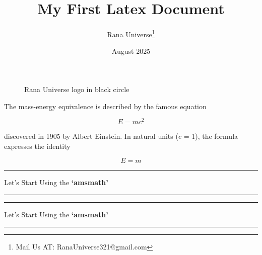 \documentclass[12pt, letterpaper]{article}
\title{My First Latex Document}
\author{Rana Universe\thanks{Mail Us AT: RanaUniverse321@gmail.com}}
\date{August 2025}
\begin{document}
\maketitle






\begin{figure}[htbp]
\centering


\caption{Rana Universe logo in black circle}

\label{fig:rana-universe-logo}

\end{figure}





\newpage


The mass-energy equivalence is described by the famous equation

\[E=mc^2\]

discovered in 1905 by Albert Einstein. 
In natural units ($c$ = 1), the formula expresses the identity

\begin{equation}
E=m
\end{equation}


\newcommand{\titlevariable}{Let's Start Using the \textbf{`amsmath'}}

\noindent\rule{\linewidth}{5pt}
\begin{center}
\titlevariable \par
\end{center}
\noindent\rule{\linewidth}{5pt}


\begin{center}
\noindent\rule{\linewidth}{5pt}
\titlevariable \par
\noindent\rule{\linewidth}{5pt}
\end{center}
\end{document}
